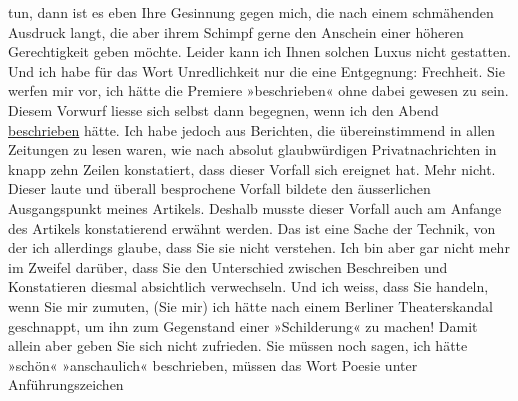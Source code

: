 \begin{ledgroupsized}[t]{13cm}
               tun, dann ist es eben Ihre Gesinnung gegen mich, die nach einem schmähenden Ausdruck
               langt, die aber ihrem Schimpf gerne den Anschein einer höheren Gerechtigkeit geben
               möchte. Leider kann ich Ihnen solchen Luxus nicht gestatten. Und ich habe für das
               Wort Unredlichkeit nur die eine Entgegnung: Frechheit.\pend
           \pstart
           Sie werfen mir vor, ich hätte die Premiere »beschrieben« ohne dabei gewesen zu sein. Diesem Vorwurf liesse
               sich selbst dann begegnen, wenn ich den Abend \uline{beschrieben} hätte. Ich habe jedoch aus Berichten, die übereinstimmend in
               allen Zeitungen zu lesen waren, wie nach absolut glaubwürdigen Privatnachrichten in
               knapp zehn Zeilen konstatiert, dass dieser Vorfall sich ereignet hat. Mehr nicht.
               Dieser laute und überall besprochene Vorfall bildete den äusserlichen Ausgangspunkt
               meines Artikels. Deshalb
               musste dieser Vorfall auch am Anfange des Artikels konstatierend erwähnt werden. Das ist eine Sache
               der Technik, von der ich allerdings glaube, dass Sie sie nicht verstehen. Ich bin
               aber gar nicht mehr im Zweifel darüber, dass Sie den Unterschied zwischen Beschreiben
               und Konstatieren diesmal absichtlich verwechseln. Und ich weiss, dass Sie \label{K_L03438-11v}\label{K_L03438-11h}
               handeln, wenn Sie mir zumuten, (Sie mir) ich hätte nach einem Berliner Theaterskandal geschnappt, um ihn zum Gegenstand einer
               »Schilderung« zu machen!\pend
           \pstart
           Damit allein aber geben Sie sich nicht zufrieden. Sie müssen noch sagen, ich hätte
               »schön« »anschaulich« beschrieben, müssen das Wort Poesie unter Anführungszeichen

\end{ledgroupsized}
